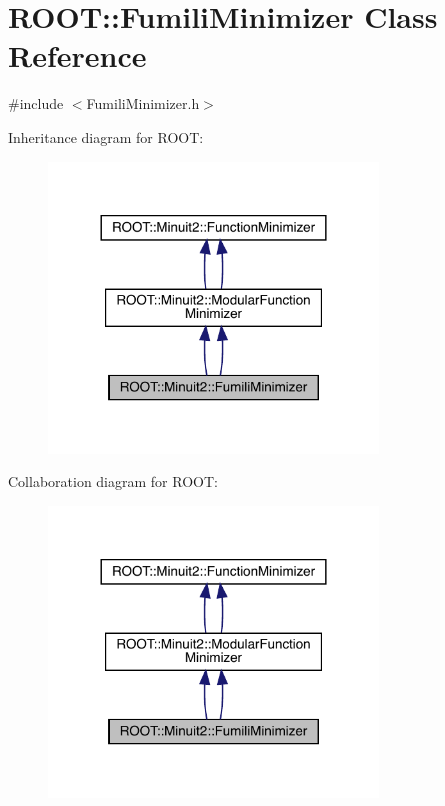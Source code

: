 \hypertarget{classROOT_1_1Minuit2_1_1FumiliMinimizer}{}\section{R\+O\+OT\+:\+:Fumili\+Minimizer Class Reference}
\label{classROOT_1_1Minuit2_1_1FumiliMinimizer}


{\ttfamily \#include $<$Fumili\+Minimizer.\+h$>$}



Inheritance diagram for R\+O\+OT\+:\nopagebreak
\begin{figure}[H]
\begin{center}
\leavevmode
\includegraphics[width=248pt]{d7/d78/classROOT_1_1Minuit2_1_1FumiliMinimizer__inherit__graph}
\end{center}
\end{figure}


Collaboration diagram for R\+O\+OT\+:\nopagebreak
\begin{figure}[H]
\begin{center}
\leavevmode
\includegraphics[width=248pt]{d6/d10/classROOT_1_1Minuit2_1_1FumiliMinimizer__coll__graph}
\end{center}
\end{figure}
